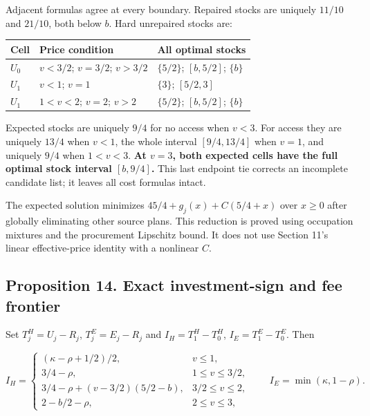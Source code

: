 \documentclass[
  11pt,
  a4paper,
]{article}
\begin{document}
Adjacent formulas agree at every boundary. Repaired stocks are uniquely
\(11/10\) and \(21/10\), both below \(b\). Hard unrepaired stocks are:

\begin{longtable}[]{@{}lll@{}}
\toprule\noalign{}
Cell & Price condition & All optimal stocks \\
\midrule\noalign{}
\endhead
\bottomrule\noalign{}
\endlastfoot
\(U_0\) & \(v<3/2\); \(v=3/2\); \(v>3/2\) & \(\{5/2\}\); \([b,5/2]\);
\(\{b\}\) \\
\(U_1\) & \(v<1\); \(v=1\) & \(\{3\}\); \([5/2,3]\) \\
\(U_1\) & \(1<v<2\); \(v=2\); \(v>2\) & \(\{5/2\}\); \([b,5/2]\);
\(\{b\}\) \\
\end{longtable}

Expected stocks are uniquely \(9/4\) for no access when \(v<3\). For
access they are uniquely \(13/4\) when \(v<1\), the whole interval
\([9/4,13/4]\) when \(v=1\), and uniquely \(9/4\) when \(1<v<3\).
\textbf{At \(v=3\), both expected cells have the full optimal stock
interval \([b,9/4]\).} This last endpoint tie corrects an incomplete
candidate list; it leaves all cost formulas intact.

The expected solution minimizes \(45/4+g_j(x)+C(5/4+x)\) over \(x\geq0\)
after globally eliminating other source plans. This reduction is proved
using occupation mixtures and the procurement Lipschitz bound. It does
not use Section 11's linear effective-price identity with a nonlinear
\(C\).

\hypertarget{proposition-14.-exact-investment-sign-and-fee-frontier}{%
\subsection{Proposition 14. Exact investment-sign and fee
frontier}\label{proposition-14.-exact-investment-sign-and-fee-frontier}}

Set \(T^H_j=U_j-R_j\), \(T^E_j=E_j-R_j\) and \(I_H=T^H_1-T^H_0\),
\(I_E=T^E_1-T^E_0\). Then

\[I_H=\begin{cases}
(\kappa-\rho+1/2)/2,&v\leq1,\\
3/4-\rho,&1\leq v\leq3/2,\\
3/4-\rho+(v-3/2)(5/2-b),&3/2\leq v\leq2,\\
2-b/2-\rho,&2\leq v\leq3,
\end{cases}\qquad I_E=\min(\kappa,1-\rho).\tag{71}\]
\end{document}
